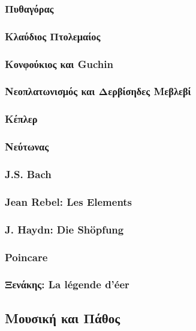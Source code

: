 \subsubsection{Πυθαγόρας}
\label{sec:org35ad389}
\subsubsection{Κλαύδιος Πτολεμαίος}
\label{sec:orgaa99d0a}
\subsubsection{Κονφούκιος και Guchin}
\label{sec:org1f21a7a}
\subsubsection{Νεοπλατωνισμός και Δερβίσηδες Μεβλεβί}
\label{sec:org3531576}
\subsubsection{Κέπλερ}
\label{sec:orgaebcc4c}
\subsubsection{Νεύτωνας}
\label{sec:org9fa94d4}
\subsubsection{J.S. Bach}
\label{sec:org01660da}
\subsubsection{Jean Rebel: Les Elements}
\label{sec:orgadfa142}
\subsubsection{J. Haydn: Die Shöpfung}
\label{sec:orgaefdbb4}
\subsubsection{Poincare}
\label{sec:org7063928}
\subsubsection{Ξενάκης: La légende d'éer}
\label{sec:org52e6a22}
\subsection{Μουσική και Πάθος}
\label{sec:orgd72e2fa}
